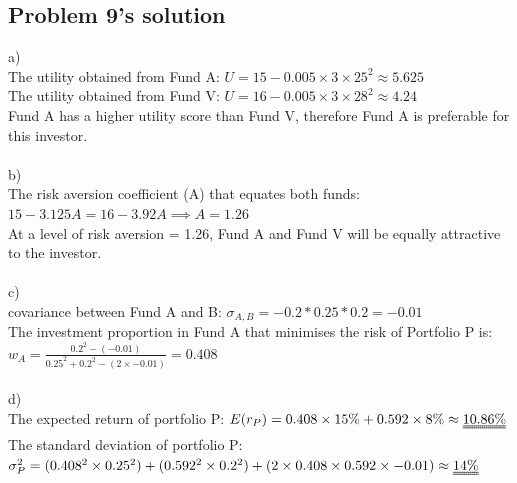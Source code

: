 \documentclass[10]{article}
\begin{document}
\color{blue}
\subsection*{Problem 9's solution}
a)\\
The utility obtained from Fund A: $U = 15 - 0.005 \times 3 \times 25^2 \approx 5.625$\\
The utility obtained from Fund V: $U = 16 - 0.005 \times 3 \times 28^2 \approx 4.24$\\
Fund A has a higher utility score than Fund V, therefore Fund A is preferable for this investor.\\
\\
b)\\
The risk aversion coefficient (A) that equates both funds:\\
$15 - 3.125A = 16 - 3.92A \implies A = 1.26$ \\
At a level of risk aversion = 1.26, Fund A and Fund V will be equally attractive to the investor.\\
\\
c)\\
covariance between Fund A and B: $\sigma_{A,B} = -0.2*0.25*0.2 = -0.01$\\
The investment proportion in Fund A that minimises the risk of Portfolio P is:\\
$w_A = \frac{0.2^2 - (-0.01)}{0.25^2 + 0.2^2 - (2 \times-0.01)} = 0.408$\\
\\
d)\\
The expected return of portfolio P: $E(r_P) = 0.408\times 15\% + 0.592 \times 8\% \approx \uuline{10.86\%}$\\
The standard deviation of portfolio P: $\sigma^2_P = (0.408^2\times 0.25^2) + (0.592^2\times0.2^2)  + (2\times0.408\times0.592\times -0.01) \approx \uuline{14\%}$
\end{document}
